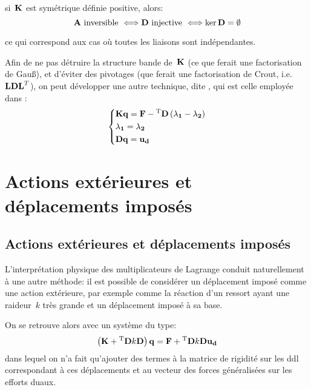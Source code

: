 \begin{theoreme}
si~$\MM{K}$ est symétrique définie positive, alors:
\begin{equation}
\MM{A} \text{ inversible } \Longleftrightarrow \MM{D} \text{ injective } \Longleftrightarrow \ker \MM{D} = \emptyset
\end{equation}
\end{theoreme}
ce qui correspond aux cas où toutes les liaisons sont indépendantes.

\bigskipvm
Afin de ne pas détruire la structure bande de~$\MM{K}$ (ce que ferait une factorisation de Gauß), 
et d'éviter des pivotages (que ferait une factorisation de Crout, i.e.~$\MM{LDL}^T$), on peut développer une autre technique, dite , qui est celle employée dans \castem:
\begin{equation}
\left\{\begin{aligned}
&\MM{K}\VV{q} = \VV{F} - \MMT{D}\left(\VV{\lambda_1} - \VV{\lambda_2}\right) \\
&\VV{\lambda_1} = \VV{\lambda_2} \\ 
&\MM{D}\VV{q} = \VV{u_d}
\end{aligned}\right.
\end{equation}

\medskip
\ifVersionAvecExemplesSepares
  \section{Actions extérieures et déplacements imposés}
\else
  \subsection{Actions extérieures et déplacements imposés}
\fi

L'interprétation physique des multiplicateurs de Lagrange conduit naturellement à une autre méthode:
il est possible de considérer un déplacement imposé comme une action extérieure, par exemple comme
la réaction d'un ressort ayant une raideur~$k$ très grande et un déplacement imposé à sa base.

\medskip
On se retrouve alors avec un système du type:
\begin{equation}
\left(\MM{K} + \MMT{D}k\MM{D}\right) \VV{q} = \VV{F} + \MMT{D}k\MM{D}\VV{u_d}
\end{equation}
dans lequel on n'a fait qu'ajouter des termes à la matrice de rigidité sur les ddl correspondant à ces
déplacements et au vecteur des forces généralisées sur les efforts duaux.

